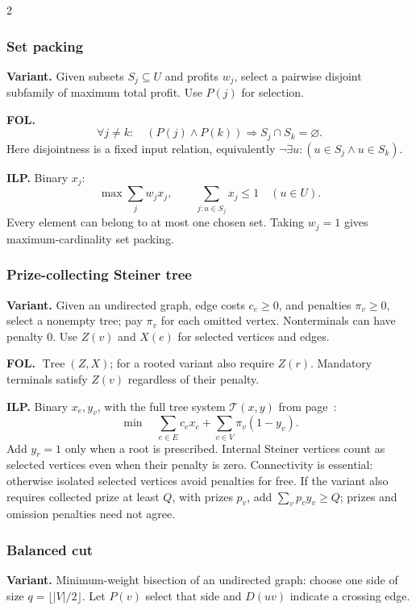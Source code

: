 \documentclass[8pt]{extarticle}
\theoremstyle{definition}
\begin{document}
\begin{multicols*}{2}
\subsubsection{Set packing}\label{form:setpack}
\textbf{Variant.} Given subsets $S_j\subseteq U$ and profits $w_j$, select
a pairwise disjoint subfamily of maximum total profit. Use $P(j)$ for selection.

\textbf{FOL.}
\[
 \forall j\ne k:\quad
 (P(j)\land P(k))\Rightarrow S_j\cap S_k=\varnothing.
\]
Here disjointness is a fixed input relation, equivalently
$\neg\exists u:(u\in S_j\land u\in S_k)$.

\textbf{ILP.} Binary $x_j$:
\[
 \max\sum_j w_jx_j,\qquad
 \sum_{j:u\in S_j}x_j\le1\quad(u\in U).
\]
Every element can belong to at most one chosen set. Taking $w_j=1$ gives
maximum-cardinality set packing.

\subsubsection{Prize-collecting Steiner tree}\label{form:pcst}
\textbf{Variant.} Given an undirected graph, edge costs $c_e\ge0$, and
penalties $\pi_v\ge0$, select a nonempty tree; pay $\pi_v$ for each omitted
vertex. Nonterminals can have penalty 0. Use $Z(v)$ and $X(e)$ for selected
vertices and edges.

\textbf{FOL.} $\operatorname{Tree}(Z,X)$; for a rooted variant also require
$Z(r)$. Mandatory terminals satisfy $Z(v)$ regardless of their penalty.

\textbf{ILP.} Binary $x_e,y_v$, with the full tree system
$\mathcal T(x,y)$ from page~\pageref{form:tree-template}:
\[
 \min\quad\sum_{e\in E}c_ex_e+\sum_{v\in V}\pi_v(1-y_v).
\]
Add $y_r=1$ only when a root is prescribed. Internal Steiner vertices count
as selected vertices even when their penalty is zero. Connectivity is
essential: otherwise isolated selected vertices avoid penalties for free.
If the variant also requires collected prize at least $Q$, with prizes
$p_v$, add $\sum_vp_vy_v\ge Q$; prizes and omission penalties need not agree.

\subsubsection{Balanced cut}\label{form:cut}
\textbf{Variant.} Minimum-weight bisection of an undirected graph: choose
one side of size $q=\lfloor |V|/2\rfloor$. Let $P(v)$ select that side and
$D(uv)$ indicate a crossing edge.


\end{multicols*}
\end{document}
